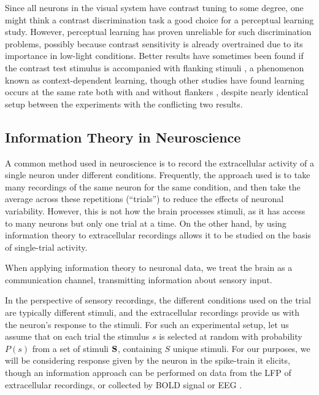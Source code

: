 
Since all neurons in the visual system have contrast tuning to some degree, one might think a contrast discrimination task a good choice for a perceptual learning study.
However, perceptual learning has proven unreliable for such discrimination problems, possibly because contrast sensitivity is already overtrained due to its importance in low-light conditions.
Better results have sometimes been found if the contrast test stimulus is accompanied with flanking stimuli \cite{Adini2002}, a phenomenon known as context-dependent learning, though other studies have found learning occurs at the same rate both with and without flankers \cite{Yu2004}, despite nearly identical setup between the experiments with the conflicting two results.

\subsection{Information Theory in Neuroscience}
\label{sec:bgit}

A common method used in neuroscience is to record the extracellular activity of a single neuron under different conditions.
Frequently, the approach used is to take many recordings of the same neuron for the same condition, and then take the average across these repetitions (``trials'') to reduce the effects of neuronal variability.
However, this is not how the brain processes stimuli, as it has access to many neurons but only one trial at a time.
On the other hand, by using information theory to extracellular recordings allows it to be studied on the basis of single-trial activity.

When applying information theory to neuronal data, we treat the brain as a communication channel, transmitting information about sensory input.

In the perspective of sensory recordings, the different conditions used on the trial are typically different stimuli, and the extracellular recordings provide us with the neuron's response to the stimuli.
For such an experimental setup, let us assume that on each trial the stimulus $s$ is selected at random with probability $P(s)$ from a set of stimuli $\mathbf{S}$, containing $S$ unique stimuli.
For our purposes, we will be considering response given by the neuron in the spike-train it elicits, though an information approach can be performed on data from the \ac{LFP} of extracellular recordings, or collected by \ac{BOLD} signal or \ac{EEG} \cite{Magri2009,Quiroga2009}.

